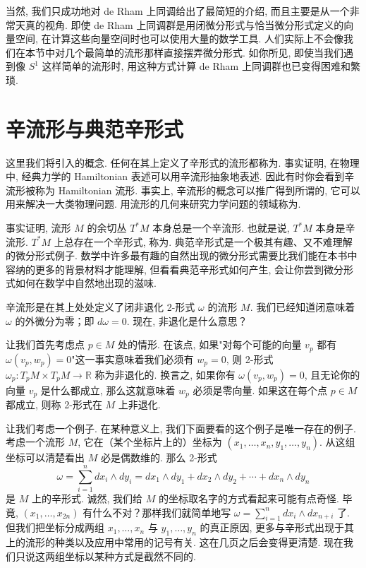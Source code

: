 当然, 我们只成功地对 de Rham 上同调给出了最简短的介绍, 而且主要是从一个非常天真的视角. 即使 de Rham 上同调群是用闭微分形式与恰当微分形式定义的向量空间, 在计算这些向量空间时也可以使用大量的数学工具. 人们实际上不会像我们在本节中对几个最简单的流形那样直接摆弄微分形式. 如你所见, 即使当我们遇到像 $S^1$ 这样简单的流形时, 用这种方式计算 de Rham 上同调群也已变得困难和繁琐.

\section{辛流形与典范辛形式}

这里我们将引入的概念. 任何在其上定义了辛形式的流形都称为. 事实证明, 在物理中, 经典力学的 Hamiltonian 表述可以用辛流形抽象地表述. 因此有时你会看到辛流形被称为 Hamiltonian 流形. 事实上, 辛流形的概念可以推广得到所谓的, 它可以用来解决一大类物理问题. 用流形的几何来研究力学问题的领域称为.

事实证明, 流形 $M$ 的余切丛 $T^*M$ 本身总是一个辛流形. 也就是说, $T^*M$ 本身是辛流形. $T^*M$ 上总存在一个辛形式, 称为. 典范辛形式是一个极其有趣、又不难理解的微分形式例子. 数学中许多最有趣的自然出现的微分形式需要比我们能在本书中容纳的更多的背景材料才能理解, 但看看典范辛形式如何产生, 会让你尝到微分形式如何在数学中自然地出现的滋味.

辛流形是在其上处处定义了闭非退化 2-形式 $\omega$ 的流形 $M$. 我们已经知道闭意味着 $\omega$ 的外微分为零；即 $d\omega=0$. 现在, 非退化是什么意思？

让我们首先考虑点 $p\in M$ 处的情形. 在该点, 如果"对每个可能的向量 $v_p$ 都有 $\omega(v_p,w_p)=0$"这一事实意味着我们必须有 $w_p=0$, 则 2-形式 $\omega_p:T_pM\times T_pM\to\mathbb{R}$ 称为非退化的. 换言之, 如果你有 $\omega(v_p,w_p)=0$, 且无论你的向量 $v_p$ 是什么都成立, 那么这就意味着 $w_p$ 必须是零向量. 如果这在每个点 $p\in M$ 都成立, 则称 2-形式在 $M$ 上非退化.

让我们考虑一个例子. 在某种意义上, 我们下面要看的这个例子是唯一存在的例子. 考虑一个流形 $M$, 它在（某个坐标片上的）坐标为 $(x_1,\ldots,x_n,y_1,\ldots,y_n)$. 从这组坐标可以清楚看出 $M$ 必是偶数维的. 那么 2-形式
\[
\omega=\sum_{i=1}^{n}dx_i\wedge dy_i=dx_1\wedge dy_1+dx_2\wedge dy_2+\cdots+dx_n\wedge dy_n
\]
是 $M$ 上的辛形式. 诚然, 我们给 $M$ 的坐标取名字的方式看起来可能有点奇怪. 毕竟, $(x_1,\ldots,x_{2n})$ 有什么不对？那样我们就简单地写 $\omega=\sum_{i=1}^{n}dx_i\wedge dx_{n+i}$ 了. 但我们把坐标分成两组 $x_1,\ldots,x_n$ 与 $y_1,\ldots,y_n$ 的真正原因, 更多与辛形式出现于其上的流形的种类以及应用中常用的记号有关. 这在几页之后会变得更清楚. 现在我们只说这两组坐标以某种方式是截然不同的.

